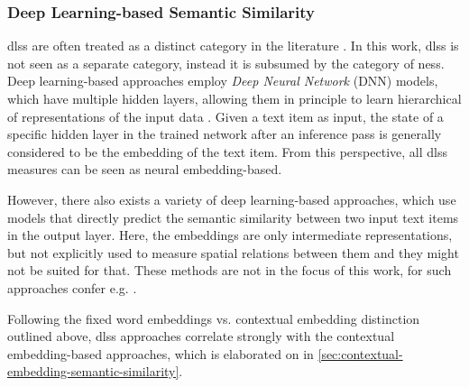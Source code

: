 \documentclass[11pt]{scrreprt}
\let\citef\cite  %
\let\cite\parencite  %
\begin{document}
\subsubsection{Deep Learning-based Semantic Similarity}
\label{sec:deep-learning-based-semantic-similarity}
\gls{dlss} are often treated as a distinct category in the literature \cite{harispeSemanticSimilarityNatural2015, chandrasekaranEvolutionSemanticSimilarity2021, hanSurveyTechniquesApplications2021, zadSurveyDeepLearning2021}. In this work, \gls{dlss} is not seen as a separate category, instead it is subsumed by the category of \gls{ness}. Deep learning-based approaches employ \textit{Deep Neural Network} (DNN) models, which have multiple hidden layers, allowing them in principle to learn hierarchical of representations of the input data \cite{goodfellowDeepLearning2016}. Given a text item as input, the state of a specific hidden layer in the trained network after an inference pass is generally considered to be the embedding of the text item. From this perspective, all \gls{dlss} measures can be seen as neural embedding-based. 

However, there also exists a variety of deep learning-based approaches, which use models that directly predict the semantic similarity between two input text items in the output layer. Here, the embeddings are only intermediate representations, but not explicitly used to measure spatial relations between them and they might not be suited for that. These methods are not in the focus of this work, for such approaches confer e.g. \citef{taiImprovedSemanticRepresentations2015, hePairwiseWordInteraction2016, shaoHCTISemEval2017Task2017, tianECNUSemEval2017Task2017, wangSentenceSimilarityLearning2017, lopez-gazpioWordNgramAttention2019, tienSentenceModelingMultiple2019, tienSentenceModelingMultiple2019a, zhengDetectionMedicalText2019}.

Following the fixed word embeddings vs. contextual embedding distinction outlined above, \gls{dlss} approaches correlate strongly with the contextual embedding-based approaches, which is elaborated on in \cref{sec:contextual-embedding-semantic-similarity}.

%
\end{document}
